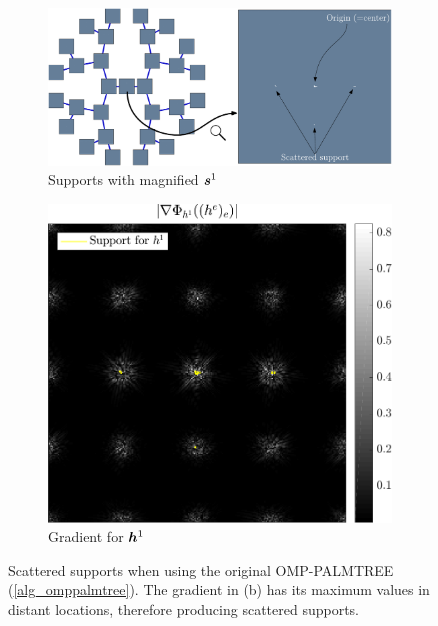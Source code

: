 \begin{figure}[!ht] \centering
\begin{subfigure}[b]{0.65\textwidth}\centering
\includegraphics[width=1\textwidth]{figures/tree-scattered-supports/supports_with_zoom.pdf}
\caption{Supports with magnified $\bm{s}^1$}\label{fig_scattered_support_tree}
\end{subfigure}
\begin{subfigure}[b]{0.34\textwidth}\centering
\includegraphics[width=1\textwidth]{figures/tree-scattered-supports/_partgrad1.pdf}
\caption{Gradient for $\bm{h}^1$}\label{fig_scattered_support_grad}
\end{subfigure}
\caption{Scattered supports when using the original OMP-PALMTREE (\cref{alg_omppalmtree}). The gradient in (b) has its maximum values in distant locations, therefore producing scattered supports.}\label{fig_scattered_support}
\end{figure}

